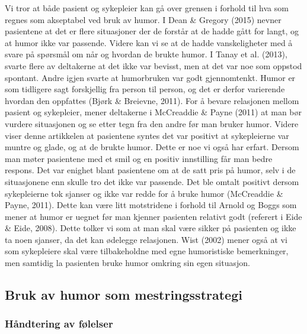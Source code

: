 Vi tror at både pasient og sykepleier kan gå over grensen i forhold til hva som
regnes som akseptabel ved bruk av humor. I Dean \&{} Gregory (2015) nevner
pasientene at det er flere situasjoner der de forstår at de hadde gått for
langt, og at humor ikke var passende. Videre kan vi se at de hadde
vanskeligheter med å svare på spørsmål om når og hvordan de brukte humor. I
Tanay et al. (2013), svarte flere av deltakerne at det ikke var bevisst, men at
det var noe som oppstod spontant. Andre igjen svarte at humorbruken var godt
gjennomtenkt.  Humor er som tidligere sagt forskjellig fra person til person,
og det er derfor varierende hvordan den oppfattes (Bjørk \&{} Breievne, 2011). For
å bevare relasjonen mellom pasient og sykepleier, mener deltakerne i McCreaddie
\&{} Payne (2011) at man bør vurdere situasjonen og se etter tegn fra den andre
før man bruker humor. Videre viser denne artikkelen at pasientene syntes det
var positivt at sykepleierne var muntre og glade, og at de brukte humor. Dette
er noe vi også har erfart. Dersom man møter pasientene med et smil og en
positiv innstilling får man bedre respons. Det var enighet blant pasientene om
at de satt pris på humor, selv i de situasjonene enn skulle tro det ikke var
passende. Det ble omtalt positivt dersom sykepleierne tok sjanser og ikke var
redde for å bruke humor (McCreaddie \&{} Payne, 2011). Dette kan være litt
motstridene i forhold til Arnold og Boggs som mener at humor er uegnet før man
kjenner pasienten relativt godt (referert i Eide \&{} Eide, 2008). Dette tolker vi
som at man skal være sikker på pasienten og ikke ta noen sjanser, da det kan
ødelegge relasjonen. Wist (2002) mener også at vi som sykepleiere skal være
tilbakeholdne med egne humoristiske bemerkninger, men samtidig la pasienten
bruke humor omkring sin egen situasjon.

\subsection{Bruk av humor som mestringsstrategi}

\subsubsection{Håndtering av følelser}

